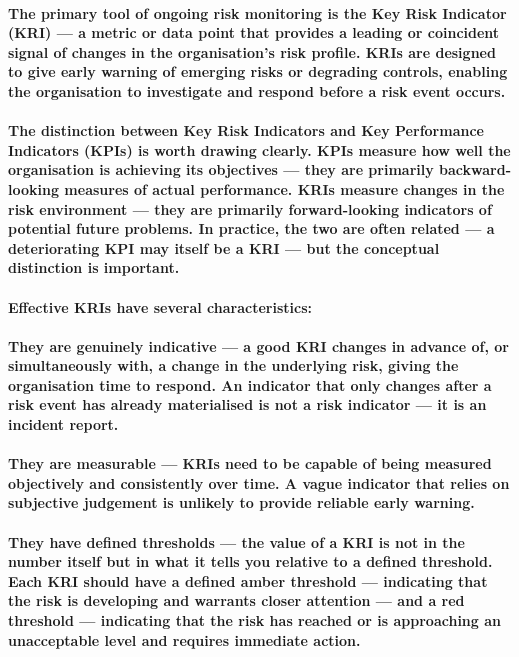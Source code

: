 \paragraph{The primary tool of ongoing risk monitoring is the \textbf{Key Risk Indicator (KRI)} — a metric or data point that provides a leading or coincident signal of changes in the organisation's risk profile. KRIs are designed to give early warning of emerging risks or degrading controls, enabling the organisation to investigate and respond before a risk event occurs.}
\paragraph{The distinction between \textbf{Key Risk Indicators and Key Performance Indicators (KPIs)} is worth drawing clearly. KPIs measure how well the organisation is achieving its objectives — they are primarily backward-looking measures of actual performance. KRIs measure changes in the risk environment — they are primarily forward-looking indicators of potential future problems. In practice, the two are often related — a deteriorating KPI may itself be a KRI — but the conceptual distinction is important.}
\paragraph{Effective KRIs have several characteristics:}
\paragraph{\textbf{They are genuinely indicative} — a good KRI changes in advance of, or simultaneously with, a change in the underlying risk, giving the organisation time to respond. An indicator that only changes after a risk event has already materialised is not a risk indicator — it is an incident report.}
\paragraph{\textbf{They are measurable} — KRIs need to be capable of being measured objectively and consistently over time. A vague indicator that relies on subjective judgement is unlikely to provide reliable early warning.}
\paragraph{\textbf{They have defined thresholds} — the value of a KRI is not in the number itself but in what it tells you relative to a defined threshold. Each KRI should have a defined amber threshold — indicating that the risk is developing and warrants closer attention — and a red threshold — indicating that the risk has reached or is approaching an unacceptable level and requires immediate action.}
